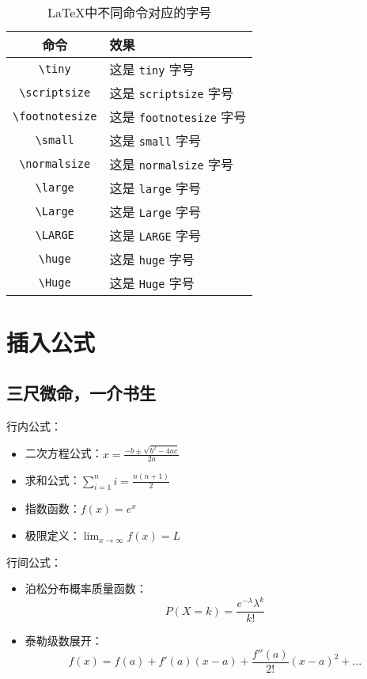 \documentclass{QHUMaster}
\begin{document}
\begin{table}
	\centering
	\caption{\LaTeX 中不同命令对应的字号}
	\begin{tabular}{|c|l|}
		\hline
		\textbf{命令} & \textbf{效果} \\
		\hline
		\verb|\tiny| & {\tiny 这是 \texttt{tiny} 字号} \\
		\hline
		\verb|\scriptsize| & {\scriptsize 这是 \texttt{scriptsize} 字号} \\
		\hline
		\verb|\footnotesize| & {\footnotesize 这是 \texttt{footnotesize} 字号} \\
		\hline
		\verb|\small| & {\small 这是 \texttt{small} 字号} \\
		\hline
		\verb|\normalsize| & {\normalsize 这是 \texttt{normalsize} 字号} \\
		\hline
		\verb|\large| & {\large 这是 \texttt{large} 字号} \\
		\hline
		\verb|\Large| & {\Large 这是 \texttt{Large} 字号} \\
		\hline
		\verb|\LARGE| & {\LARGE 这是 \texttt{LARGE} 字号} \\
		\hline
		\verb|\huge| & {\huge 这是 \texttt{huge} 字号} \\
		\hline
		\verb|\Huge| & {\Huge 这是 \texttt{Huge} 字号} \\
		\hline
	\end{tabular}
\end{table}

\section{插入公式}
\subsection{三尺微命，一介书生}

行内公式：
\begin{itemize}
	\item 二次方程公式：$x = \frac{-b \pm \sqrt{b^2 - 4ac}}{2a}$
	\item 求和公式：$\sum_{i=1}^{n} i = \frac{n(n+1)}{2}$
	\item 指数函数：$f(x) = e^x$
	\item 极限定义：$\lim_{x \to \infty} f(x) = L$
\end{itemize}

行间公式：
\begin{itemize}
	\item 泊松分布概率质量函数：
	\[
	P(X=k) = \frac{e^{-\lambda} \lambda^k}{k!}
	\]
	\item 泰勒级数展开：
	\[
	f(x) = f(a) + f'(a)(x-a) + \frac{f''(a)}{2!}(x-a)^2 + \ldots
	\]
\end{itemize}
\end{document}
